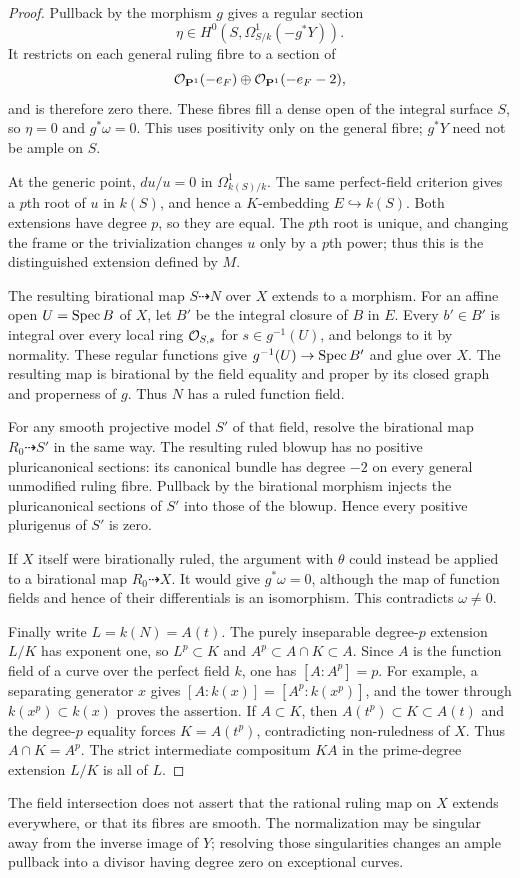 \begin{proof}
Pullback by the morphism $g$ gives a regular section
\[
 \eta\in H^0(S,\Omega^1_{S/k}(-g^*Y)).
\]
It restricts on each general ruling fibre to a section of
\[
 \mathcal O_{\mathbf P^1}(-e_F)\oplus\mathcal O_{\mathbf P^1}(-e_F-2),
\]
and is therefore zero there. These fibres fill a dense open
of the integral surface $S$, so $\eta=0$ and $g^*\omega=0$.
This uses positivity only on the general fibre; $g^*Y$
need not be ample on $S$.

At the generic point, $du/u=0$ in $\Omega^1_{k(S)/k}$.
The same perfect-field criterion gives a $p$th root of $u$
in $k(S)$, and hence a $K$-embedding $E\hookrightarrow k(S)$.
Both extensions have degree $p$, so they are equal.
The $p$th root is unique, and changing the frame or the
trivialization changes $u$ only by a $p$th power; thus this
is the distinguished extension defined by $M$.

The resulting birational map $S\dashrightarrow N$ over $X$
extends to a morphism. For an affine open $U=\operatorname{Spec} B$ of
$X$, let $B'$ be the integral closure of $B$ in $E$.
Every $b'\in B'$ is integral over every local ring
$\mathcal O_{S,s}$ for $s\in g^{-1}(U)$, and belongs to it by
normality. These regular functions give
$g^{-1}(U)\to\operatorname{Spec} B'$ and glue over $X$.
The resulting map is birational by the field equality and
proper by its closed graph and properness of $g$.
Thus $N$ has a ruled function field.

For any smooth projective model $S'$ of that field, resolve
the birational map $R_0\dashrightarrow S'$ in the same way.
The resulting ruled blowup has no positive pluricanonical
sections: its canonical bundle has degree $-2$ on every
general unmodified ruling fibre. Pullback by the birational
morphism injects the pluricanonical sections of $S'$ into
those of the blowup. Hence every positive plurigenus of
$S'$ is zero.

If $X$ itself were birationally ruled, the argument with
$\theta$ could instead be applied to a birational map
$R_0\dashrightarrow X$. It would give $g^*\omega=0$, although
the map of function fields and hence of their differentials
is an isomorphism. This contradicts $\omega\ne0$.

Finally write $L=k(N)=A(t)$. The purely inseparable
degree-$p$ extension $L/K$ has exponent one, so
$L^p\subset K$ and $A^p\subset A\cap K\subset A$.
Since $A$ is the function field of a curve over the perfect
field $k$, one has $[A:A^p]=p$. For example, a separating
generator $x$ gives $[A:k(x)]=[A^p:k(x^p)]$, and the tower
through $k(x^p)\subset k(x)$ proves the assertion.
If $A\subset K$, then
$A(t^p)\subset K\subset A(t)$ and the degree-$p$ equality
forces $K=A(t^p)$, contradicting non-ruledness of $X$.
Thus $A\cap K=A^p$. The strict intermediate compositum
$KA$ in the prime-degree extension $L/K$ is all of $L$.
\end{proof}

The field intersection does not assert that the rational ruling
map on $X$ extends everywhere, or that its fibres are smooth.
The normalization may be singular away from the inverse image
of $Y$; resolving those singularities changes an ample pullback
into a divisor having degree zero on exceptional curves.
